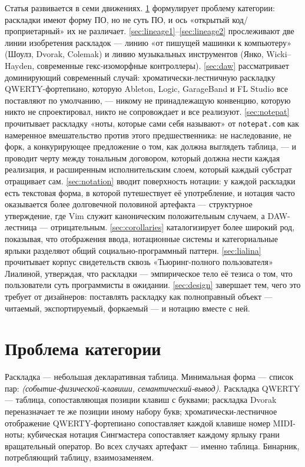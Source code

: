 \documentclass[10pt,letterpaper,twocolumn]{article}
\begin{document}
Статья развивается в семи движениях. \textsection\ref{sec:category} формулирует проблему категории: раскладки имеют форму ПО, но не суть ПО, и ось «открытый код/проприетарный» их не различает. \textsection\ref{sec:lineage1}--\ref{sec:lineage2} прослеживают две линии изобретения раскладок --- линию «от пишущей машинки к компьютеру» (Шоулз, Dvorak, Colemak) и линию музыкальных инструментов (Янко, Wicki--Hayden, современные гекс-изоморфные контроллеры). \textsection\ref{sec:daw} рассматривает доминирующий современный случай: хроматически-лестничную раскладку QWERTY-фортепиано, которую Ableton, Logic, GarageBand и FL Studio все поставляют по умолчанию, --- никому не принадлежащую конвенцию, которую никто не спроектировал, никто не сопровождает и все реализуют. \textsection\ref{sec:notepat} прочитывает раскладку «ноты, которые сами себя называют» от \texttt{notepat.com} как намеренное вмешательство против этого предшественника: не наследование, не форк, а конкурирующее предложение о том, как должна выглядеть таблица, --- и проводит черту между тональным договором, который должна нести каждая реализация, и расширенным исполнительским слоем, который каждый субстрат отращивает сам. \textsection\ref{sec:notation} вводит поверхность нотации: у каждой раскладки есть текстовая форма, в которой путешествует её употребление, и нотация часто оказывается более долговечной половиной артефакта --- структурное утверждение, где Vim служит каноническим положительным случаем, а DAW-лестница --- отрицательным. \textsection\ref{sec:corollaries} каталогизирует более широкий род, показывая, что отображения ввода, нотационные системы и категориальные ярлыки разделяют общий социально-программный паттерн. \textsection\ref{sec:lialina} прочитывает корпус свидетельств сквозь «Тьюринг-полного пользователя» Лиалиной, утверждая, что раскладки --- эмпирическое тело её тезиса о том, что пользователи суть программисты в ожидании. \textsection\ref{sec:design} завершает тем, чего это требует от дизайнеров: поставлять раскладку как полноправный объект --- читаемый, экспортируемый, форкаемый --- и нотацию вместе с ней.

\section{Проблема категории}
\label{sec:category}

Раскладка --- небольшая декларативная таблица. Минимальная форма --- список пар: \emph{(событие-физической-клавиши, семантический-вывод)}. Раскладка QWERTY --- таблица, сопоставляющая позиции клавиш с буквами; раскладка Dvorak переназначает те же позиции иному набору букв; хроматически-лестничное отображение QWERTY-фортепиано сопоставляет каждой клавише номер MIDI-ноты; кубическая нотация Сингмастера сопоставляет каждому ярлыку грани вращательный оператор. Во всех случаях артефакт --- именно таблица. Бинарник, потребляющий таблицу, взаимозаменяем.
\end{document}
